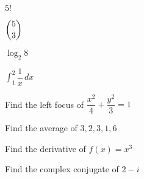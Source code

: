\begin{example}
  $5!$
\end{example}

\begin{example}
  $\dbinom{5}{3}$
\end{example}

\begin{example}
  $\log_2{8}$
\end{example}

\begin{example}
  $\displaystyle \int_1^2 \dfrac{1}{x} \, dx$
\end{example}

\begin{example}
  Find the left focus of $\dfrac{x^2}{4} + \dfrac{y^2}{3} = 1$
\end{example}

\begin{example}
  Find the average of $3, 2, 3, 1, 6$
\end{example}

\begin{example}
  Find the derivative of $f(x) = x^3$
\end{example}

\begin{example}
  Find the complex conjugate of $2 - i$
\end{example}
